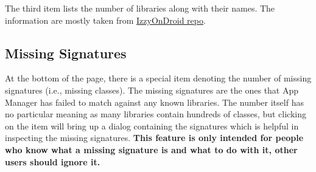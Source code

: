 The third item lists the number of libraries along with their names. The information are mostly
taken from \href{https://gitlab.com/IzzyOnDroid/repo}{IzzyOnDroid repo}.


\subsection{Missing Signatures}\label{subsec:missing-signatures} %
At the bottom of the page, there is a special item denoting the number of missing signatures (i.e.,
missing classes). The missing signatures are the ones that App Manager has failed to match against
any known libraries. The number itself has no particular meaning as many libraries contain hundreds
of classes, but clicking on the item will bring up a dialog containing the signatures which is
helpful in inspecting the missing signatures. \textbf{This feature is only intended for people who
know what a missing signature is and what to do with it, other users should ignore it.}
